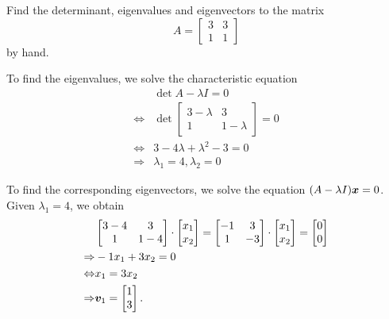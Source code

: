\documentclass
[answers]
{exercise_sheet}
\begin{document}
\begin{Question}{1}
Find the determinant, eigenvalues and eigenvectors to the matrix 
\begin{equation*}
A = 
\begin{bmatrix}
3 & 3 \\
1 & 1
\end{bmatrix}
\end{equation*}
by hand.
\end{Question}

\makeatletter\if@answers\begin{Answer}{2}
To find the eigenvalues, we solve the characteristic equation
\begin{align*}
& \det{A - \lambda I} = 0 \\
\Leftrightarrow & \det \begin{bmatrix}
3-\lambda & 3 \\
1 & 1-\lambda
\end{bmatrix} = 0 \\
\Leftrightarrow & 3 - 4\lambda + \lambda^2 - 3 = 0 \\
\Rightarrow & \lambda_1 = 4, \lambda_2 = 0
\end{align*}

To find the corresponding eigenvectors, we solve the equation $(A - \lambda I) \bm{x} = 0$. Given $\lambda_1 = 4$, we obtain
\begin{align*}
&
\begin{bmatrix}
3-4 & 3 \\
1 & 1-4
\end{bmatrix}
\cdot 
\begin{bmatrix}
x_1 \\
x_2
\end{bmatrix}
=
\begin{bmatrix}
-1 & 3 \\
1 & -3
\end{bmatrix}
\cdot 
\begin{bmatrix}
x_1 \\
x_2
\end{bmatrix}
=
\begin{bmatrix}
0 \\
0
\end{bmatrix}
\\
\Rightarrow & -1 x_1 + 3 x_2 = 0 \\
\Leftrightarrow & x_1 = 3 x_2 \\
\Rightarrow & \bm{v}_1 = \begin{bmatrix}
1 \\
3
\end{bmatrix}
.
\end{align*}


\end{Answer}
\end{document}
